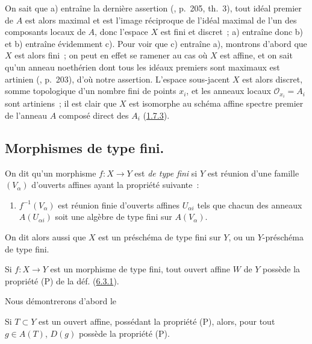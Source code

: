On sait que a) entraîne la dernière assertion (\cite{I-13}, p.~205, th.~3),
tout idéal premier de $A$ est alors maximal et est l'image réciproque de
l'idéal maximal de l'un des composants locaux de $A$, donc l'espace $X$ est
fini et discret~; a) entraîne donc b) et b) entraîne évidemment c). Pour voir
que c) entraîne a), montrons d'abord que $X$ est alors fini~; on peut en effet
se ramener au cas où $X$ est affine, et on sait qu'un anneau noethérien dont
tous les idéaux premiers sont maximaux est artinien (\cite{I-13}, p.~203),
d'où notre assertion. L'espace sous-jacent $X$ est alors discret, somme
topologique d'un nombre fini de points $x_i$, et les anneaux locaux
$\mathscr{O}_{x_i}=A_i$ sont artiniens~; il est clair que $X$ est isomorphe au
schéma affine spectre premier de l'anneau $A$ composé direct des $A_i$
(\hyperref[I.1.7.3-fr]{1.7.3}).

\subsection{Morphismes de type fini.}
\label{subsection:I.6.3-fr}

\begin{definition}[6.3.1]
\label{I.6.3.1-fr}
On dit qu'un morphisme $f:X\to Y$ est \emph{de type fini} si $Y$ est réunion
d'une famille $(V_\alpha)$ d'ouverts affines ayant la propriété suivante~:
\begin{enumerate}
  \item[(P)] $f^{-1}(V_\alpha)$ est réunion finie d'ouverts affines
    $U_{\alpha i}$ tels que chacun des anneaux $A(U_{\alpha i})$ soit une
    algèbre de type fini sur $A(V_\alpha)$.
\end{enumerate}
On dit alors aussi que $X$ est un préschéma de type fini sur $Y$, ou un
$Y$-préschéma de type fini.
\end{definition}

\begin{proposition}[6.3.2]
\label{I.6.3.2-fr}
Si $f:X\to Y$ est un morphisme de type fini, tout ouvert affine $W$ de $Y$
possède la propriété (P) de la déf. (\hyperref[I.6.3.1-fr]{6.3.1}).
\end{proposition}

Nous démontrerons d'abord le

\begin{lemma}[6.3.2.1]
\label{I.6.3.2.1-fr}
Si $T\subset Y$ est un ouvert affine, possédant la propriété (P), alors, pour
tout $g\in A(T)$, $D(g)$ possède la propriété (P).
\end{lemma}


